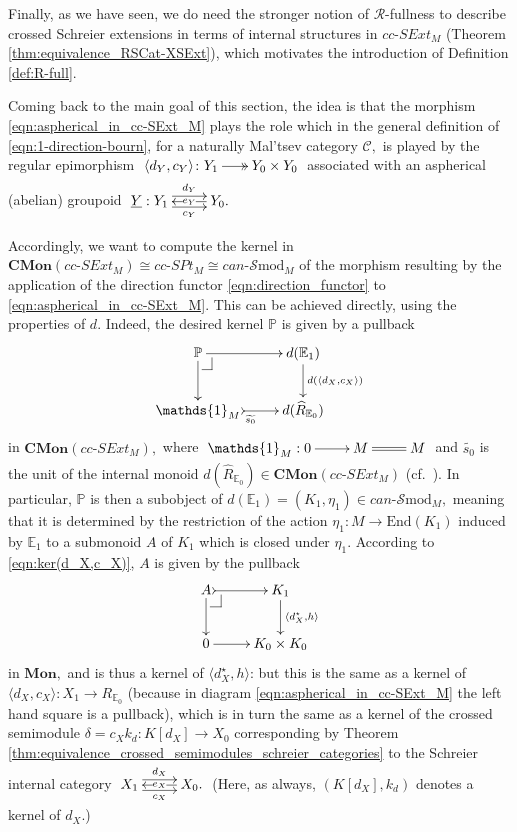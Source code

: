 \documentclass[a4paper]{amsart}
\makeatletter
\theoremstyle{plain}
\theoremstyle{definition}
\theoremstyle{remark}
\newcommand{\pullback}[4]{{#1 \leftindex_{#2}{\times}_{#3} #4}}
\newcommand{\la}{\langle}
\newcommand{\ra}{\rangle}
\def\pullback{%
 \ar@{-}[]+R+<4pt,-3pt>;[]+RD+<4pt,-6pt>%
 \ar@{-}[]+D+<3pt,-6pt>;[]+RD+<4pt,-6pt>}
\makeatother
\begin{document}
Finally, as we have seen, we do need the stronger notion of $\mathcal{R}$-fullness to describe crossed Schreier extensions in terms of internal structures in $cc\text{-}SExt_M$ (Theorem \ref{thm:equivalence_RSCat-XSExt}), which motivates the introduction of Definition \ref{def:R-full}.

Coming back to the main goal of this section, the idea is that the morphism \eqref{eqn:aspherical_in_cc-SExt_M} plays the role which in the general definition of \eqref{eqn:1-direction-bourn}, for a naturally Mal'tsev category $\mathcal{C},$ is played by the regular epimorphism $\xymatrixcolsep{1.5pc}\xymatrix{{\la d_Y,c_Y\ra\colon Y_1}  \ar@{->>}[r] &{Y_0\times Y_0}}$ associated with an aspherical (abelian) groupoid $\xymatrix{{\underline{Y}: Y_1} \ar@<.9ex>[r]^-{d_Y} \ar@<-.9ex>[r]_-{c_Y} &{Y_0.} \ar[l]|-{e_Y}}$

Accordingly, we want to compute the kernel in $\mathbf{CMon}(cc\text{-}SExt_M)\cong cc\text{-}SPt_M\cong can\text{-}\mathcal{S}\mathrm{mod}_M$ of the morphism resulting by the application of the direction functor \eqref{eqn:direction_functor} to \eqref{eqn:aspherical_in_cc-SExt_M}. This can be achieved directly, using the properties of $d.$ Indeed, the desired kernel $\mathbb{P}$ is given by a pullback
\begin{equation}
\label{eqn:ker(d_X,c_X)}
\begin{aligned}
\xymatrix{
{\mathbb{P}} \pullback\ar[r] \ar[d] &{d({\mathbb{E}}_1)} \ar[d]^-{d(\la d_X,c_X \ra)} \\
{{\mathds{1}}_M} \ar@{>->}[r]_{\widetilde{s_0}} &{d(\widehat{R}_{{\mathbb{E}}_0})}
}
\end{aligned}
\end{equation}
in $\mathbf{CMon}(cc\text{-}SExt_M),$ where $\xymatrix{{{\mathds{1}}_M:0} \ar[r] &M \ar@{=}[r] &{M}}$ and $\widetilde{s_0}$ is the unit of the internal monoid $d(\widehat{R}_{{\mathbb{E}}_0})\in\mathbf{CMon}(cc\text{-}SExt_M)$ (cf.~\cite[Theorem 6.5]{AMR}). In particular, $\mathbb{P}$ is then a subobject of $d({\mathbb{E}}_1)=(K_1,\eta_1)\in can\text{-}\mathcal{S}\mathrm{mod}_M,$ meaning that it is determined by the restriction of the action $\eta_1\colon M\rightarrow\mathrm{End}(K_1)$ induced by $\mathbb{E}_1$ to a submonoid $A$ of $K_1$ which is closed under $\eta_1.$ According to \eqref{eqn:ker(d_X,c_X)}, $A$ is given by the pullback
\begin{equation*}
\xymatrix{
A \pullback\ar@{>->}[r] \ar[d] &{K_1} \ar[d]^-{\la d^\star_X,h\ra} \\
{0} \ar[r] &{K_0\times K_0}
}
\end{equation*}
in $\mathbf{Mon},$ and is thus a kernel of $\la d^\star_X,h\ra$: but this is the same as a kernel of $\la d_X,c_X\ra\colon X_1\longrightarrow R_{{\mathbb{E}}_0}$ (because in diagram \eqref{eqn:aspherical_in_cc-SExt_M} the left hand square is a pullback), which is in turn the same as a kernel of the crossed semimodule $\delta=c_Xk_d\colon K[d_X]\longrightarrow X_0$ corresponding by Theorem \ref{thm:equivalence_crossed_semimodules_schreier_categories} to the Schreier internal category $\xymatrix{{X_1} \ar@<.9ex>[r]^-{d_X} \ar@<-.9ex>[r]_-{c_X} &{X_0.} \ar[l]|-{e_X} }$ (Here, as always, $(K[d_X],k_d)$ denotes a kernel of $d_X.$)
\end{document}
